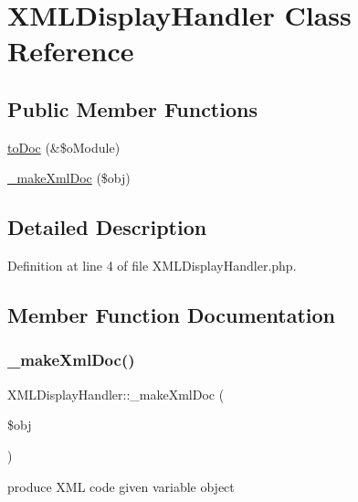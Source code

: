 \hypertarget{classXMLDisplayHandler}{}\section{X\+M\+L\+Display\+Handler Class Reference}
\label{classXMLDisplayHandler}
\subsection*{Public Member Functions}
\begin{DoxyCompactItemize}
\item 
\hyperlink{classXMLDisplayHandler_adebe0869fea845f4007acc2b84e2d24c}{to\+Doc} (\&\$o\+Module)
\item 
\hyperlink{classXMLDisplayHandler_a1b3cb79d65e9ddb997dfaaeea70809ae}{\+\_\+make\+Xml\+Doc} (\$obj)
\end{DoxyCompactItemize}


\subsection{Detailed Description}


Definition at line 4 of file X\+M\+L\+Display\+Handler.\+php.



\subsection{Member Function Documentation}
\mbox{\label{classXMLDisplayHandler_a1b3cb79d65e9ddb997dfaaeea70809ae}} 
\subsubsection{\texorpdfstring{\+\_\+make\+Xml\+Doc()}{\_makeXmlDoc()}}
{\footnotesize\ttfamily X\+M\+L\+Display\+Handler\+::\+\_\+make\+Xml\+Doc (\begin{DoxyParamCaption}\item[{}]{\$obj }\end{DoxyParamCaption})}

produce X\+ML code given variable object~\newline

